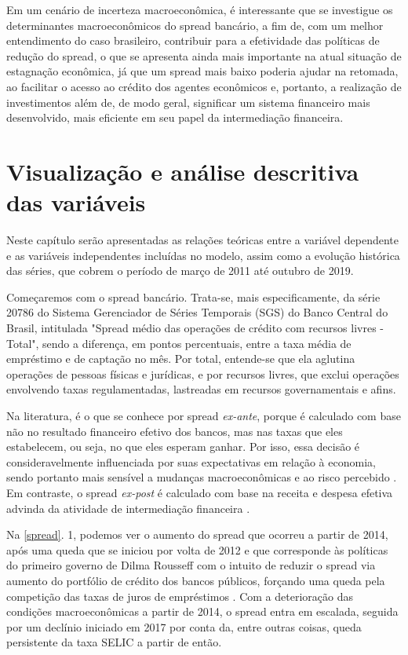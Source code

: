 \documentclass[a4paper,
               article,
               12pt,
               openany,
               oneside,
               english,
               brazil]{abntex2}
\numberwithin{equation}{section}
\begin{document}
    Em um cenário de incerteza macroeconômica, é interessante que se investigue os determinantes macroeconômicos do spread bancário, a fim de, com um melhor entendimento do caso brasileiro, contribuir para a efetividade das políticas de redução do spread, o que se apresenta ainda mais importante na atual situação de estagnação econômica, já que um spread mais baixo poderia ajudar na retomada, ao facilitar o acesso ao crédito dos agentes econômicos e, portanto, a realização de investimentos \cite[p.~8]{manhica12} além de, de modo geral, significar um sistema financeiro mais desenvolvido, mais eficiente em seu papel da intermediação financeira.

\section{Visualização e análise descritiva das variáveis}

    Neste capítulo serão apresentadas as relações teóricas entre a variável dependente e as variáveis independentes incluídas no modelo, assim como a evolução histórica das séries, que cobrem o período de março de 2011 até outubro de 2019.

    Começaremos com o spread bancário. Trata-se, mais especificamente, da série 20786 do Sistema Gerenciador de Séries Temporais (SGS) do Banco Central do Brasil, intitulada "Spread médio das operações de crédito com recursos livres - Total", sendo a diferença, em pontos percentuais, entre a taxa média de empréstimo e de captação no mês. Por total, entende-se que ela aglutina operações de pessoas físicas e jurídicas, e por recursos livres, que exclui operações envolvendo taxas regulamentadas, lastreadas em recursos governamentais e afins.

    Na literatura, é o que se conhece por spread \textit{ex-ante}, porque é calculado com base não no resultado financeiro efetivo dos bancos, mas nas taxas que eles estabelecem, ou seja, no que eles esperam ganhar. Por isso, essa decisão é consideravelmente influenciada por suas expectativas em relação à economia, sendo portanto mais sensível a mudanças macroeconômicas e ao risco percebido \cite[p.~226]{leal07}. Em contraste, o spread \textit{ex-post} é calculado com base na receita e despesa efetiva advinda da atividade de intermediação financeira \cite[p.~2]{almeida15}. 
    
    Na \autoref{spread}. 1, podemos ver o aumento do spread que ocorreu a partir de 2014, após uma queda que se iniciou por volta de 2012 e que corresponde às políticas do primeiro governo de Dilma Rousseff com o intuito de reduzir o spread via aumento do portfólio de crédito dos bancos públicos, forçando uma queda pela competição das taxas de juros de empréstimos \cite[p.~1]{almeida15}. Com a deterioração das condições macroeconômicas a partir de 2014, o spread entra em escalada, seguida por um declínio iniciado em 2017 por conta da, entre outras coisas, queda persistente da taxa SELIC a partir de então.
\end{document}
